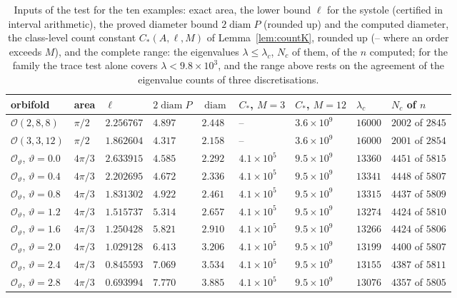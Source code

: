 \documentclass[pdflatex,sn-mathphys-num]{sn-jnl}
\theoremstyle{thmstyleone}%
\theoremstyle{thmstylethree}%
\newcommand{\Orb}{\mathcal{O}}
\newcommand{\diam}{\operatorname{diam}}
\begin{document}
\begin{table}[t]
\centering\footnotesize
\caption{Inputs of the test for the ten examples: exact area, the lower bound $\ell$ for the systole (certified in interval arithmetic), the proved diameter bound $2\diam P$ (rounded up) and the computed diameter, the class-level count constant $C_*(A,\ell,M)$ of Lemma~\ref{lem:countK}, rounded up (-- where an order exceeds $M$), and the complete range: the eigenvalues $\lambda\le\lambda_c$, $N_c$ of them, of the $n$ computed; for the family the trace test alone covers $\lambda<9.8\times10^3$, and the range above rests on the agreement of the eigenvalue counts of three discretisations.}\label{tab:inputs}
\setlength{\tabcolsep}{4pt}\begin{tabular}{@{}lllllllll@{}}
\toprule
orbifold & area & $\ell$ & $2\diam P$ & $\diam$ & $C_*$, $M=3$ & $C_*$, $M=12$ & $\lambda_c$ & $N_c$ of $n$\\
\midrule
$\Orb(2,8,8)$ & $\pi/2$ & $2.256767$ & $4.897$ & $2.448$ & -- & $3.6\times10^{9}$ & $16000$ & $2002$ of $2845$\\
$\Orb(3,3,12)$ & $\pi/2$ & $1.862604$ & $4.317$ & $2.158$ & -- & $3.6\times10^{9}$ & $16000$ & $2001$ of $2854$\\
$\Orb_\vartheta$, $\vartheta=0.0$ & $4\pi/3$ & $2.633915$ & $4.585$ & $2.292$ & $4.1\times10^{5}$ & $9.5\times10^{9}$ & $13360$ & $4451$ of $5815$\\
$\Orb_\vartheta$, $\vartheta=0.4$ & $4\pi/3$ & $2.202695$ & $4.672$ & $2.336$ & $4.1\times10^{5}$ & $9.5\times10^{9}$ & $13341$ & $4448$ of $5807$\\
$\Orb_\vartheta$, $\vartheta=0.8$ & $4\pi/3$ & $1.831302$ & $4.922$ & $2.461$ & $4.1\times10^{5}$ & $9.5\times10^{9}$ & $13315$ & $4437$ of $5809$\\
$\Orb_\vartheta$, $\vartheta=1.2$ & $4\pi/3$ & $1.515737$ & $5.314$ & $2.657$ & $4.1\times10^{5}$ & $9.5\times10^{9}$ & $13274$ & $4424$ of $5810$\\
$\Orb_\vartheta$, $\vartheta=1.6$ & $4\pi/3$ & $1.250428$ & $5.821$ & $2.910$ & $4.1\times10^{5}$ & $9.5\times10^{9}$ & $13266$ & $4424$ of $5806$\\
$\Orb_\vartheta$, $\vartheta=2.0$ & $4\pi/3$ & $1.029128$ & $6.413$ & $3.206$ & $4.1\times10^{5}$ & $9.5\times10^{9}$ & $13199$ & $4400$ of $5807$\\
$\Orb_\vartheta$, $\vartheta=2.4$ & $4\pi/3$ & $0.845593$ & $7.069$ & $3.534$ & $4.1\times10^{5}$ & $9.5\times10^{9}$ & $13155$ & $4387$ of $5811$\\
$\Orb_\vartheta$, $\vartheta=2.8$ & $4\pi/3$ & $0.693994$ & $7.770$ & $3.885$ & $4.1\times10^{5}$ & $9.5\times10^{9}$ & $13076$ & $4357$ of $5805$\\
\bottomrule
\end{tabular}
\end{table}
\end{document}
